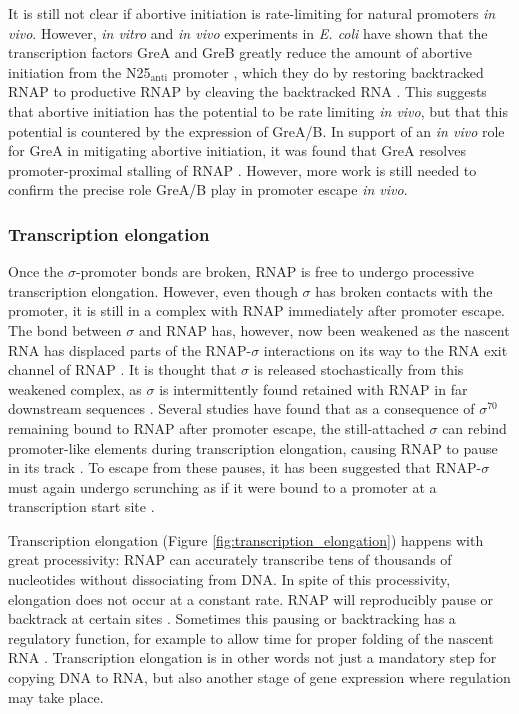 It is still not clear if abortive initiation is rate-limiting for natural
promoters \textit{in vivo}. However, \textit{in vitro} and \textit{in vivo}
experiments in \textit{E. coli} have shown that the transcription factors GreA
and GreB greatly reduce the amount of abortive initiation from the
N25$_{\text{anti}}$ promoter \cite{hsu_escherichia_1995}, which they do by
restoring backtracked RNAP to productive RNAP by cleaving the backtracked RNA
\cite{hsu_initial_2006, toulme_grea_2000}. This suggests that abortive
initiation has the potential to be rate limiting \textit{in vivo}, but that
this potential is countered by the expression of GreA/B. In support of an
\textit{in vivo} role for GreA in mitigating abortive initiation, it was found
that GreA resolves promoter-proximal stalling of RNAP
\cite{kusuya_transcription_2011}. However, more work is still needed to confirm
the precise role GreA/B play in promoter escape \textit{in vivo}.

\subsubsection{Transcription elongation}
Once the $\sigma$-promoter bonds are broken, RNAP is free to undergo processive
transcription elongation. However, even though $\sigma$ has broken contacts
with the promoter, it is still in a complex with RNAP immediately after
promoter escape. The bond between $\sigma$ and RNAP has, however, now been
weakened as the nascent RNA has displaced parts of the RNAP-$\sigma$
interactions on its way to the RNA exit channel of RNAP
\cite{mekler_structural_2002, nickels_interaction_2005}. It is thought that
$\sigma$ is released stochastically from this weakened complex, as $\sigma$ is
intermittently found retained with RNAP in far downstream sequences
\cite{mooney_sigma_2005}. Several studies have found that as a consequence of
$\sigma^{70}$ remaining bound to RNAP after promoter escape, the still-attached
$\sigma$ can rebind promoter-like elements during transcription elongation,
causing RNAP to pause in its track \cite{ring_function_1996,
kapanidis_retention_2005, raffaelle_holoenzyme_2005}. To escape from these
pauses, it has been suggested that RNAP-$\sigma$ must again undergo scrunching
as if it were bound to a promoter at a transcription start site
\cite{zhilina_structural_2012}.

Transcription elongation (Figure \ref{fig:transcription_elongation}) happens
with great processivity: RNAP can accurately transcribe tens of thousands of
nucleotides without dissociating from DNA. In spite of this processivity,
elongation does not occur at a constant rate. RNAP will reproducibly pause or
backtrack at certain sites \cite{herbert_sequence-resolved_2006}. Sometimes
this pausing or backtracking has a regulatory function, for example to allow
time for proper folding of the nascent RNA \cite{landick_regulatory_2006}.
Transcription elongation is in other words not just a mandatory step for
copying DNA to RNA, but also another stage of gene expression where regulation
may take place.

